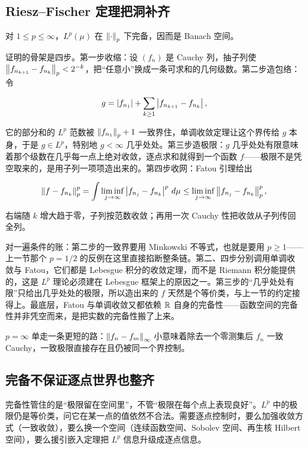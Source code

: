 \subsection{Riesz--Fischer 定理把洞补齐}

\begin{theorem}
对 \(1\le p\le\infty\)，\(L^p(\mu)\) 在 \(\left\lVert\cdot\right\rVert_p\) 下完备，因而是 Banach 空间。
\end{theorem}

证明的骨架是四步。第一步收缩：设 \((f_n)\) 是 Cauchy 列，抽子列使 \(\left\lVert f_{n_{k+1}}-f_{n_k}\right\rVert_p<2^{-k}\)，把``任意小''换成一条可求和的几何级数。第二步造包络：令

\[
g=\left|f_{n_1}\right|+\sum_{k\ge1}\left|f_{n_{k+1}}-f_{n_k}\right|,
\]

它的部分和的 \(L^p\) 范数被 \(\left\lVert f_{n_1}\right\rVert_p+1\) 一致界住，单调收敛定理让这个界传给 \(g\) 本身，于是 \(g\in L^p\)，特别地 \(g<\infty\) 几乎处处。第三步造极限：\(g\) 几乎处处有限意味着那个级数在几乎每一点上绝对收敛，逐点求和就得到一个函数 \(f\)——极限不是凭空取来的，是用子列一项项造出来的。第四步收网：Fatou 引理给出

\[
\left\lVert f-f_{n_k}\right\rVert_p^p
=\int\liminf_{j\to\infty}\left|f_{n_j}-f_{n_k}\right|^p\,d\mu
\le\liminf_{j\to\infty}\left\lVert f_{n_j}-f_{n_k}\right\rVert_p^p,
\]

右端随 \(k\) 增大趋于零，子列按范数收敛；再用一次 Cauchy 性把收敛从子列传回全列。

对一遍条件的账：第二步的一致界要用 Minkowski 不等式，也就是要用 \(p\ge1\)——上一节那个 \(p=1/2\) 的反例在这里直接掐断整条链。第二、四步分别调用单调收敛与 Fatou，它们都是 Lebesgue 积分的收敛定理，而不是 Riemann 积分能提供的，这是 \(L^p\) 理论必须建在 Lebesgue 框架上的原因之一。第三步的``几乎处处有限''只给出几乎处处的极限，所以造出来的 \(f\) 天然是个等价类，与上一节的约定接得上。最底层，Fatou 与单调收敛又都依赖 \(\mathbb{R}\) 自身的完备性——函数空间的完备性并非凭空而来，是把实数的完备性搬了上来。

\(p=\infty\) 单走一条更短的路：\(\left\lVert f_n-f_m\right\rVert_\infty\) 小意味着除去一个零测集后 \(f_n\) 一致 Cauchy，一致极限直接存在且仍被同一个界控制。

\subsection{完备不保证逐点世界也整齐}

完备性管住的是``极限留在空间里''，不管``极限在每个点上表现良好''。\(L^p\) 中的极限仍是等价类，问它在某一点的值依然不合法。需要逐点控制时，要么加强收敛方式（一致收敛），要么换一个空间（连续函数空间、Sobolev 空间、再生核 Hilbert 空间），要么援引嵌入定理把 \(L^p\) 信息升级成逐点信息。

